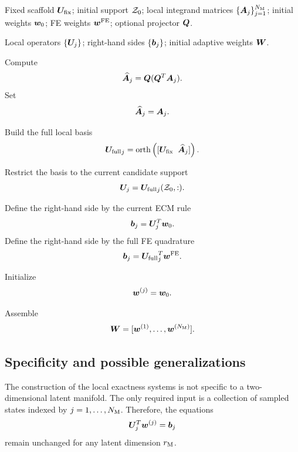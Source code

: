 \documentclass[11pt,a4paper]{article}
\begin{document}
\begin{algorithm}[H]
\caption{Construction of local exactness systems}
\label{alg:local_exactness_systems}
\begin{algorithmic}[1]

\Require
Fixed scaffold $\bm U_{\mathrm{fix}}$;
initial support $\mathcal{Z}_{0}$;
local integrand matrices $\{\bm A_j\}_{j=1}^{N_{\mathrm{M}}}$;
initial weights $\bm w_{0}$;
FE weights $\bm w^{\mathrm{FE}}$;
optional projector $\bm Q$.

\Ensure
Local operators $\{\bm U_j\}$;
right-hand sides $\{\bm b_j\}$;
initial adaptive weights $\bm W$.


        \State Compute
        \[
            \widehat{\bm A}_j
            =
            \bm Q(\bm Q^T\bm A_j).
        \]
    \Else
        \State Set
        \[
            \widehat{\bm A}_j=\bm A_j.
        \]
    \EndIf

    \State Build the full local basis
    \[
        {\bm U_{\mathrm{full}}}_j
        =
        \operatorname{orth}
        \left(
        [\bm U_{\mathrm{fix}}\;\;\widehat{\bm A}_j]
        \right).
    \]

    \State Restrict the basis to the current candidate support
    \[
        \bm U_j={\bm U_{\mathrm{full}}}_j(\mathcal{Z}_{0},:).
    \]

        \State Define the right-hand side by the current ECM rule
        \[
            \bm b_j=\bm U_j^T\bm w_{0}.
        \]
    \Else
        \State Define the right-hand side by the full FE quadrature
        \[
            \bm b_j={\bm U_{\mathrm{full}}}_j^T\bm w^{\mathrm{FE}}.
        \]
    \EndIf

    \State Initialize
    \[
        \bm w^{(j)}=\bm w_{0}.
    \]

\EndFor

\State Assemble
\[
        \bm W =
        [\bm w^{(1)},\ldots,\bm w^{(N_{\mathrm{M}})}].
\]

\end{algorithmic}
\end{algorithm}

\subsection{Specificity and possible generalizations}

The construction of the local exactness systems is not specific to a
two-dimensional latent manifold. The only required input is a collection of
sampled states indexed by $j=1,\ldots,N_{\mathrm{M}}$. Therefore, the equations
\[
        \bm U_j^T\bm w^{(j)}=\bm b_j
\]
remain unchanged for any latent dimension $r_{\mathrm{M}}$.
\end{document}
